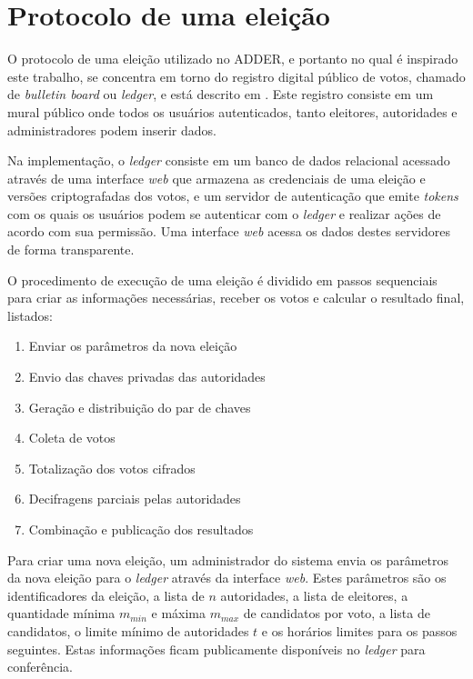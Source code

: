 \section{Protocolo de uma eleição}

O protocolo de uma eleição utilizado no ADDER, e portanto no qual é inspirado
este trabalho, se concentra em torno do registro digital público de votos,
chamado de \textit{bulletin board} ou \textit{ledger}, e está descrito em
\textcite{benaloh1987verifiable}. Este registro consiste em um mural público
onde todos os usuários autenticados, tanto eleitores, autoridades e
administradores podem inserir dados.

Na implementação, o \textit{ledger} consiste em um banco de dados relacional
acessado através de uma interface \textit{web} que armazena as credenciais de
uma eleição e versões criptografadas dos votos, e um servidor de autenticação
que emite \textit{tokens} com os quais os usuários podem se autenticar com o
\textit{ledger} e realizar ações de acordo com sua permissão. Uma interface
\textit{web} acessa os dados destes servidores de forma transparente.

O procedimento de execução de uma eleição é dividido em passos sequenciais para
criar as informações necessárias, receber os votos e calcular o resultado
final, listados:

\begin{enumerate}
    \item Enviar os parâmetros da nova eleição
    \item Envio das chaves privadas das autoridades
    \item Geração e distribuição do par de chaves
    \item Coleta de votos
    \item Totalização dos votos cifrados
    \item Decifragens parciais pelas autoridades
    \item Combinação e publicação dos resultados
\end{enumerate}

Para criar uma nova eleição, um administrador do sistema envia os parâmetros da
nova eleição para o \textit{ledger} através da interface \textit{web}. Estes
parâmetros são os identificadores da eleição, a lista de $n$ autoridades, a
lista de eleitores, a quantidade mínima $m_{min}$ e máxima $m_{max}$ de
candidatos por voto, a lista de candidatos, o limite mínimo de autoridades $t$
e os horários limites para os passos seguintes. Estas informações ficam
publicamente disponíveis no \textit{ledger} para conferência.

